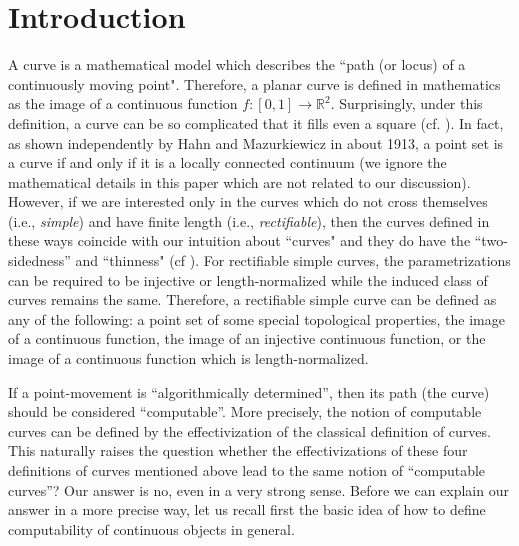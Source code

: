 \documentclass{LMCS}
\theoremstyle{plain}
\def\IR{\mathbb{R}}
\begin{document}
\section{Introduction}\label{sec-intro}

A curve is a mathematical model which describes the ``path (or locus) of a continuously moving point". Therefore, a planar curve is defined in mathematics as the image of a continuous function $f: [0, 1] \to \IR^2$. Surprisingly, under this definition, a curve can be so complicated that it fills even a square (cf. \cite{Peano1890,EHMoo1900}). In fact, as shown independently by Hahn and Mazurkiewicz in about 1913, a point set is a curve if and only if it is a locally connected continuum (we ignore the mathematical details in this paper which are not related to our discussion). However, if we are interested only in the curves which do not cross themselves (i.e., {\em simple}) and have finite length (i.e., {\em rectifiable}), then the curves defined in these ways coincide with our intuition about ``curves" and they do have the ``two-sidedness'' and ``thinness" (cf \cite{Why42}). For rectifiable simple curves, the parametrizations can be required to be injective or length-normalized while the induced class of curves remains the same. Therefore, a rectifiable simple curve can be defined as any of the following: a point set of some special topological properties, the image of a continuous function, the image of an injective continuous function, or the image of a continuous function which is length-normalized.

If a point-movement is ``algorithmically determined'', then its path (the curve) should be considered ``computable''. More precisely, the notion of computable curves can be defined by the effectivization of the classical definition of curves. This naturally raises the question whether the effectivizations of these four definitions of curves mentioned above lead to the same notion of ``computable curves''? Our answer is no, even in a very strong sense. Before we can explain our answer in a more precise way, let us recall first the basic idea of how to define computability of continuous objects in general.
\end{document}
